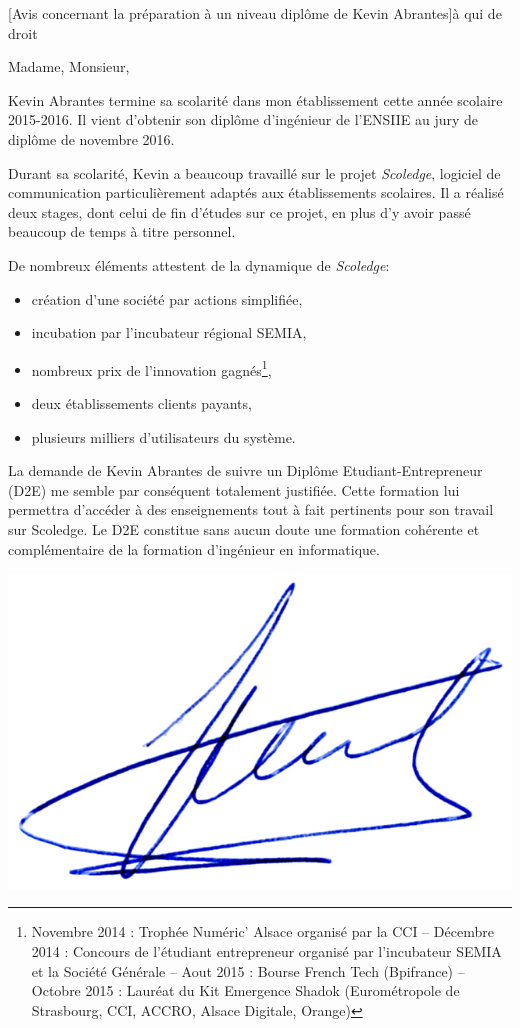 \documentclass[a4paper,10pt]{article}
\begin{document}

\begin{letter}[Avis concernant la préparation à un niveau diplôme de Kevin Abrantes]{à}%
{qui de droit}


Madame, Monsieur,

Kevin Abrantes termine sa scolarité dans mon établissement cette année scolaire
2015-2016. Il vient d'obtenir son diplôme d'ingénieur de l'ENSIIE au jury de
diplôme de novembre 2016.

Durant sa scolarité, Kevin a beaucoup travaillé sur le projet \textit{Scoledge},
logiciel de communication particulièrement adaptés aux établissements scolaires.
Il a réalisé deux stages, dont celui de fin d'études sur ce projet, en plus 
d'y avoir passé beaucoup de temps à titre personnel.

De nombreux éléments attestent de la dynamique de \textit{Scoledge}:
\begin{itemize}
\item création d'une société par actions simplifiée,
\item incubation par l'incubateur régional SEMIA,
\item nombreux prix de l'innovation gagnés\footnote{Novembre 2014 : Trophée Numéric' Alsace organisé par la CCI
-- Décembre 2014 : Concours de l'étudiant entrepreneur organisé par l'incubateur SEMIA et la Société Générale
-- Aout 2015 : Bourse French Tech (Bpifrance)
-- Octobre 2015 : Lauréat du Kit Emergence Shadok (Eurométropole de Strasbourg, CCI, ACCRO, Alsace Digitale, Orange)}, 
\item deux établissements clients payants,
\item plusieurs milliers d'utilisateurs du système.
\end{itemize}


\vspace{.5cm}

La demande de Kevin Abrantes de suivre un Diplôme Etudiant-Entrepreneur (D2E) me
semble  par  conséquent  totalement  justifiée. Cette  formation  lui  permettra
d'accéder  à des  enseignements  tout à  fait pertinents  pour  son travail  sur
Scoledge.  Le  D2E  constitue  sans  aucun  doute  une  formation  cohérente  et
complémentaire de la formation d'ingénieur en informatique.





\end{letter}
\begin{flushright}
\includegraphics[width=.2\textwidth]{signgenaud.jpg}
\end{flushright}
\end{document}
